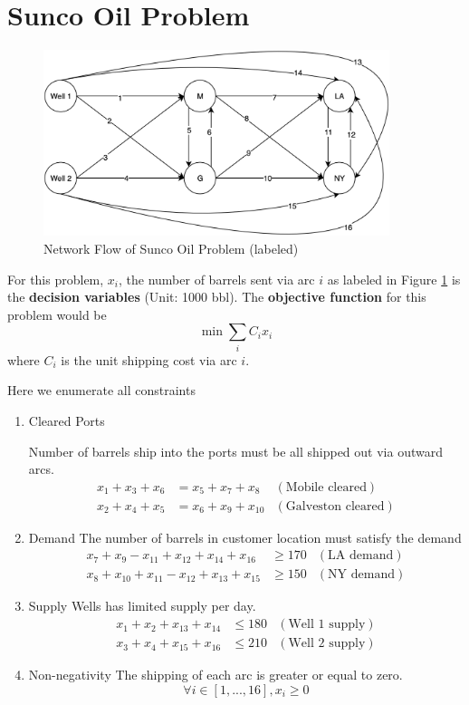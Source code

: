 \section{Sunco Oil Problem}\label{prob2}

\begin{figure}[h]
    \centering
\includegraphics[width=0.9\textwidth]{hw1/EECS416-homework1-problem2.png}    
    \caption{Network Flow of Sunco Oil Problem (labeled)}
    \label{fig:sunco_nodes}
\end{figure}

For this problem, $x_i$, the number of barrels sent via arc $i$ as labeled in Figure \ref{fig:sunco_nodes} is the \textbf{decision variables} (Unit: 1000 bbl). The \textbf{objective function} for this problem would be 
$$
\min \sum_i C_i x_i
$$
where $C_i$ is the unit shipping cost via arc $i$. 

Here we enumerate all constraints
\begin{enumerate}
\item Cleared Ports\par
Number of barrels ship into the ports must be all shipped out via outward arcs.
\begin{align*}
x_1 + x_3 + x_6 &= x_5 + x_7 + x_8 &(\text{Mobile cleared})\\
x_2 + x_4 + x_5 &= x_6 + x_9 + x_{10} &(\text{Galveston cleared})
\end{align*}

\item Demand
The number of barrels in customer location must satisfy the demand
\begin{align*}
x_7 + x_9 - x_{11} + x_{12} + x_{14} + x_{16} &\geq 170 &(\text{LA demand})\\
x_8 + x_{10} + x_{11} - x_{12} + x_{13} + x_{15} &\geq 150 &(\text{NY demand}) 
\end{align*}

\item Supply
Wells has limited supply per day. 
\begin{align*}
x_1 + x_2 + x_{13} + x_{14} &\leq 180 &(\text{Well 1 supply})\\
x_3 + x_4 + x_{15} + x_{16} &\leq 210 &(\text{Well 2 supply})
\end{align*}

\item Non-negativity
The shipping of each arc is greater or equal to zero.
$$
\forall i \in [1,...,16], x_i \geq 0
$$

\end{enumerate}

